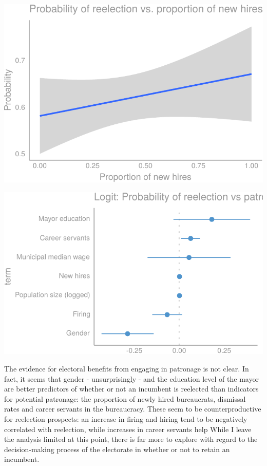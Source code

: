 \documentclass[12pt,]{article}
\begin{document}
\begin{center}\includegraphics{dissertation_files/figure-latex/reelection-1} \end{center}

\begin{center}\includegraphics{dissertation_files/figure-latex/reelection-2} \end{center}

The evidence for electoral benefits from engaging in patronage is not
clear. In fact, it seems that gender - unsurprisingly - and the
education level of the mayor are better predictors of whether or not an
incumbent is reelected than indicators for potential patronage: the
proportion of newly hired bureaucrats, dismissal rates and career
servants in the bureaucracy. These seem to be counterproductive for
reelection prospects: an increase in firing and hiring tend to be
negatively correlated with reelection, while increases in career
servants help While I leave the analysis limited at this point, there is
far more to explore with regard to the decision-making process of the
electorate in whether or not to retain an incumbent.
\end{document}
